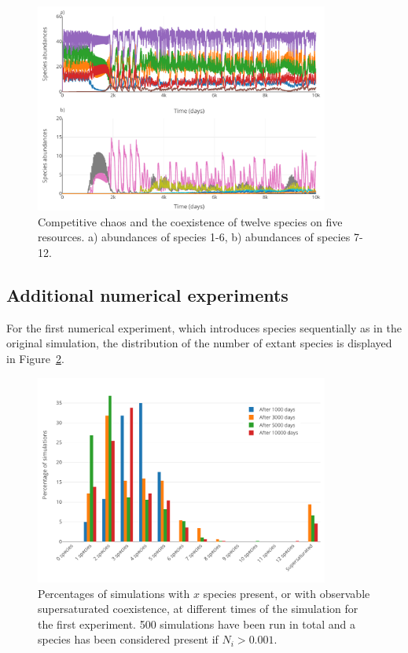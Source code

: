 \begin{figure}[H]
	\begin{center} 
		\includegraphics[width=0.86\textwidth]{../Code/Figures/Figure_4.pdf}
 		\caption{Competitive chaos and the coexistence of twelve species on five resources. a) abundances of species 1-6, b) abundances of species 7-12. }
 		\label{figures:Fig4}
	\end{center}
\end{figure}

\subsection{Additional numerical experiments}

For the first numerical experiment, which introduces species sequentially as in the original simulation, the distribution of the number of extant species is displayed in Figure~\ref{figures:Figexp1bar}.

\begin{figure}[H]
	\begin{center} 
		\includegraphics[width=0.86\textwidth]{../Code/Figures/Figure_exp1_bar.pdf}
 		\caption{Percentages of simulations with $x$ species present, or with observable supersaturated coexistence, at different times of the simulation for the first experiment. 500 simulations have been run in total and a species has been considered present if $N_i > 0.001$.}
 		\label{figures:Figexp1bar}
	\end{center}
\end{figure}

